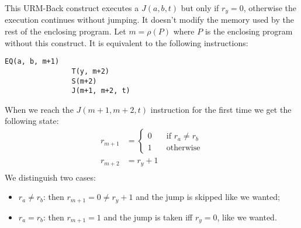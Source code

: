 \documentclass[a4paper, 12pt]{article}
\begin{document}
\begin{itemize}
            This URM-Back construct executes a $J(a, b, t)$ but only if $r_y = 0$, otherwise the execution continues without jumping. It doesn't modify the memory used by the rest of the enclosing program. Let $m = \rho (P)$ where $P$ is the enclosing program without this construct. It is equivalent to the following instructions:
            \clearpage
            \begin{lstlisting}[language=URM]
                EQ(a, b, m+1)
                T(y, m+2)
                S(m+2)
                J(m+1, m+2, t)
            \end{lstlisting}
            When we reach the $J(m+1, m+2, t)$ instruction for the first time we get the following state:
            \begin{align*}
                r_{m+1} &= \begin{cases}
                    0 &\quad\text{if } r_a \neq r_b \\
                    1 &\quad\text{otherwise}
                \end{cases} \\
                r_{m+2} &= r_y + 1 \\
            \end{align*}
            We distinguish two cases:
            \begin{itemize}
                \item $r_a \neq r_b$: then $r_{m+1} = 0 \neq r_y + 1$ and the jump is skipped like we wanted;
                \item $r_a = r_b$: then $r_{m+1} = 1$ and the jump is taken iff $r_y = 0$, like we wanted.
            \end{itemize}
    \end{itemize}
\end{document}
